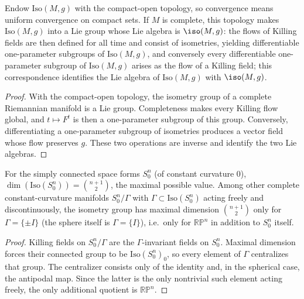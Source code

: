\begin{lemma}
  \label{lem:pet-ch8-killing-flow-oneparameter-subgroup}

  Endow $\mathrm{Iso}(M,g)$ with the compact-open topology, so convergence means
  uniform convergence on compact sets. If $M$ is complete, this topology makes
  $\mathrm{Iso}(M,g)$ into a Lie group whose Lie algebra is $\iso(M,g)$: the
  flows of Killing fields are then defined for all time and consist of
  isometries, yielding differentiable one-parameter subgroups of
  $\mathrm{Iso}(M,g)$, and conversely every differentiable one-parameter
  subgroup of $\mathrm{Iso}(M,g)$ arises as the flow of a Killing field; this
  correspondence identifies the Lie algebra of $\mathrm{Iso}(M,g)$ with
  $\iso(M,g)$.
\end{lemma}
\begin{proof}
  \sketch
  With the compact-open topology, the isometry group of a complete Riemannian
  manifold is a Lie group. Completeness makes every Killing flow global, and
  \(t\mapsto F^t\) is then a one-parameter subgroup of this group. Conversely,
  differentiating a one-parameter subgroup of isometries produces a vector
  field whose flow preserves \(g\). These two operations are inverse and
  identify the two Lie algebras.
\end{proof}

\begin{remark}
  \label{rem:pet-ch8-max-isometry-space-forms}

  For the simply connected space forms $S^n_0$ (of constant curvature $0$),
  $\dim(\mathrm{Iso}(S^n_0))=\binom{n+1}2$, the maximal possible value. Among
  other complete constant-curvature manifolds $S^n_0/\Gamma$ with
  $\Gamma\subset\mathrm{Iso}(S^n_0)$ acting freely and discontinuously, the
  isometry group has maximal dimension $\binom{n+1}2$ only for
  $\Gamma=\{\pm I\}$ (the sphere itself is $\Gamma=\{I\}$), i.e.\ only for
  $\mathbb{RP}^n$ in addition to $S^n_0$ itself.
\end{remark}
\begin{proof}
  \sketch
  Killing fields on \(S^n_0/\Gamma\) are the \(\Gamma\)-invariant fields on
  \(S^n_0\). Maximal dimension forces their connected group to be
  \(\mathrm{Iso}(S^n_0)_0\), so every element of \(\Gamma\) centralizes that
  group. The centralizer consists only of the identity and, in the spherical
  case, the antipodal map. Since the latter is the only nontrivial such element
  acting freely, the only additional quotient is \(\mathbb{RP}^n\).
\end{proof}

